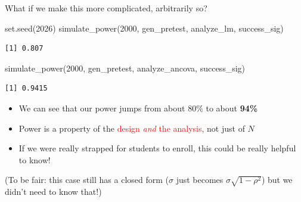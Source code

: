 \documentclass[
  ignorenonframetext,
  aspectratio=169,
]{beamer}
\newenvironment{Shaded}{\begin{snugshade}}{\end{snugshade}}
\newcommand{\DecValTok}[1]{\textcolor[rgb]{0.68,0.00,0.00}{#1}}
\newcommand{\FunctionTok}[1]{\textcolor[rgb]{0.28,0.35,0.67}{#1}}
\newcommand{\NormalTok}[1]{\textcolor[rgb]{0.00,0.23,0.31}{#1}}
\providecommand{\tightlist}{%
  \setlength{\itemsep}{0pt}\setlength{\parskip}{0pt}}\usepackage{longtable,booktabs,array}
\begin{document}
\begin{frame}[fragile]{What if we make this more complicated,
arbitrarily so?}
\label{what-if-we-make-this-more-complicated-arbitrarily-so-2}
\begin{Shaded}
\begin{Highlighting}[]
\FunctionTok{set.seed}\NormalTok{(}\DecValTok{2026}\NormalTok{)}
\FunctionTok{simulate\_power}\NormalTok{(}\DecValTok{2000}\NormalTok{, gen\_pretest, analyze\_lm, success\_sig)}
\end{Highlighting}
\end{Shaded}

\begin{verbatim}
[1] 0.807
\end{verbatim}

\begin{Shaded}
\begin{Highlighting}[]
\FunctionTok{simulate\_power}\NormalTok{(}\DecValTok{2000}\NormalTok{, gen\_pretest, analyze\_ancova, success\_sig)}
\end{Highlighting}
\end{Shaded}

\begin{verbatim}
[1] 0.9415
\end{verbatim}

\vskip10pt

\begin{itemize}
\tightlist
\item
  We can see that our power jumps from about 80\% to about \textbf{94\%}
\item
  Power is a property of the
  \textcolor{red}{design \textit{and} the analysis}, not just of \(N\)
\item
  If we were really strapped for students to enroll, this could be
  really helpful to know!
\end{itemize}

\small

(To be fair: this case still has a closed form (\(\sigma\) just becomes
\(\sigma\sqrt{1-\rho^2}\)) but we didn't need to know that!)
\end{frame}
\end{document}
